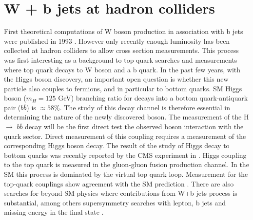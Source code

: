 
\section{W + b jets at hadron colliders}

First theoretical computations of W boson production in association with b jets were published in 1993 \cite{Mangano:1992kp}. However only recently enough luminosity has been collected at hadron colliders to allow cross section measurements. This process was first interesting as a background to top quark searches and measurements where top quark decays to W boson and a b quark. In the past few years, with the Higgs boson discovery, an important open question is whether this new particle also couples to fermions, and in particular to bottom quarks. 
SM Higgs boson ($m_H=125$ GeV) branching ratio for decays into a bottom quark-antiquark pair ($b\bar{b}$) is $\approx 58\%$. The study of this decay channel is therefore essential in determining the nature of the newly discovered boson. The measurement of the H $\rightarrow$ $b\bar{b}$ decay will be the first direct test the observed boson interaction with the quark sector. Direct measurement of this coupling requires a measurement of the corresponding Higgs boson decay. The result of the study of Higgs decay to bottom quarks was recently reported by the CMS experiment in  \cite{Chatrchyan:2013zna,Chatrchyan:2014vua}. Higgs coupling to the top quark is measured in the gluon-gluon fusion production channel. In the SM this process is dominated by the virtual top quark loop. Measurement for the top-quark couplings show agreement with the SM prediction \cite{Khachatryan:2014jba}.
There are also searches for beyond SM physics where contributions from W+b jets process is substantial, among others supersymmetry searches with lepton, b jets and missing energy in the final state \cite{Chatrchyan:2012sca}.

